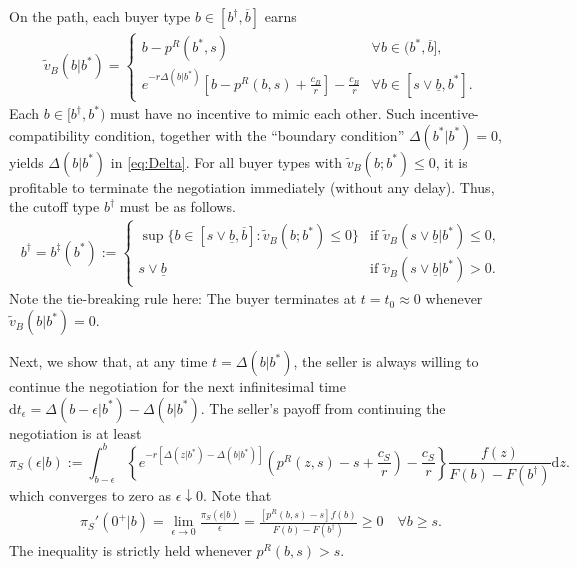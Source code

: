 On the path, each buyer type $b\in[b^\dagger,\overline b]$ earns
    \begin{align}\nonumber
    \widetilde v_B (b|b^*)=
    \left\{
    \begin{array}{ll}
    b-p^R(b^*,s) & \forall b\in(b^*, \overline b],
    \\[10pt]
    \displaystyle e^{-r\Delta (b|b^*)}\left[b-p^R(b, s)+\frac{c_B}{r}\right]-\frac{c_B}{r}  & \forall b\in[s\vee\underline b, b^*].
    \end{array}\right.
    \end{align}
Each $b\in[b^\dagger,b^*)$ must have no incentive to mimic each other.
Such incentive-compatibility condition, together with the ``boundary condition'' $\Delta (b^*|b^*)=0$, yields $\Delta (b|b^*)$ in \eqref{eq:Delta}.
For all buyer types with $\widetilde v_B (b;b^*)\leq 0$, it is profitable to terminate the negotiation immediately (without any delay). Thus, the cutoff type $b^\dagger$ must be as follows.
	\begin{align}\label{eq:b_ddagger}
	b^\dagger=b^\ddagger(b^*):=
    \left\{
    \begin{array}{cl}
    \sup \big\{b\in[s\vee \underline b, \overline b]: \widetilde v_B (b;b^*)\leq 0\big\} & \text{if $\widetilde v_B (s\vee \underline b|b^*)\leq 0$,}
    \\[5pt]
    s \vee \underline b & \text{if $\widetilde v_B (s\vee \underline b|b^*)> 0$.}
    \end{array}\right. 
	\end{align}
Note the tie-breaking rule here: The buyer terminates at $t=t_0\approx 0$ whenever $\widetilde v_B(b|b^*)=0$.


Next, we show that, at any time $t=\Delta (b|b^*)$, the seller is always willing to continue the negotiation for the next infinitesimal time $\text{d}t_\epsilon = \Delta (b-\epsilon|b^*)-\Delta (b|b^*)$. The seller's payoff from continuing the negotiation is at least 
	$$
	\pi_S(\epsilon|b):=\int_{b-\epsilon}^b 
	\left\{e^{-r[\Delta (z|b^*)-\Delta (b|b^*)]} \left(p^R(z,s)-s+\frac{c_S}{r}\right)-\frac{c_S}{r}\right\}
	\frac{f(z)}{F(b)-F(b^\dagger)}\text{d}z.
	$$
which converges to zero as $\epsilon\downarrow 0$. Note that 
	\begin{align*}
	\pi_S'(0^+|b) 
	=\lim_{\epsilon\to 0}\frac{\pi_S(\epsilon|b)}{\epsilon}
	=\frac{[p^R(b,s)-s]f(b)}{F(b)-F(b^\dagger)}\geq 0 
    \quad\forall b\geq s.
	\end{align*}
The inequality is strictly held whenever $p^R(b,s)>s$. 

